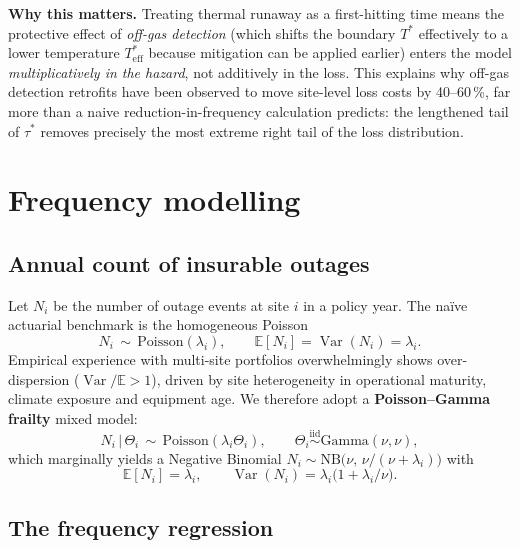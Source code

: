 \documentclass[11pt,a4paper]{article}
\let\origsection\section
\renewcommand{\section}{\clearpage\origsection}
\theoremstyle{ia}
\newcommand{\E}{\mathbb{E}}
\newcommand{\Var}{\operatorname{Var}}
\newcommand{\1}{\mathbf{1}}
\newcommand{\given}{\,\vert\,}
\begin{document}
\begin{nbox}
\textbf{Why this matters.} Treating thermal runaway as a first-hitting
time means the protective effect of \emph{off-gas detection} (which
shifts the boundary $T^*$ effectively to a lower temperature $T^*_\mathrm{eff}$
because mitigation can be applied earlier) enters the model
\emph{multiplicatively in the hazard}, not additively in the loss.
This explains why off-gas detection retrofits have been observed to
move site-level loss costs by 40--60\,\%, far more than a naive
reduction-in-frequency calculation predicts: the lengthened tail of
$\tau^*$ removes precisely the most extreme right tail of the loss
distribution.
\end{nbox}

\section{Frequency modelling}\label{sec:freq}

\subsection{Annual count of insurable outages}

Let $N_i$ be the number of outage events at site $i$ in a policy
year. The naïve actuarial benchmark is the homogeneous Poisson
\begin{equation}\label{eq:Poi}
   N_i \,\sim\, \mathrm{Poisson}(\lambda_i),\qquad
   \E[N_i]=\Var(N_i)=\lambda_i .
\end{equation}
Empirical experience with multi-site portfolios overwhelmingly
shows over-dispersion ($\Var/\E\!>\!1$), driven by site
heterogeneity in operational maturity, climate exposure and
equipment age. We therefore adopt a \textbf{Poisson--Gamma frailty}
mixed model:
\begin{equation}\label{eq:NB}
   N_i \given \Theta_i \,\sim\, \mathrm{Poisson}(\lambda_i \Theta_i),
   \qquad \Theta_i \stackrel{\mathrm{iid}}{\sim} \mathrm{Gamma}(\nu,\nu),
\end{equation}
which marginally yields a Negative Binomial
$N_i\sim\mathrm{NB}\bigl(\nu,\,\nu/(\nu+\lambda_i)\bigr)$ with
\begin{equation}
   \E[N_i]=\lambda_i,\qquad
   \Var(N_i)=\lambda_i\bigl(1+\lambda_i/\nu\bigr).
\end{equation}

\subsection{The frequency regression}\label{ss:freq-reg}
\end{document}
